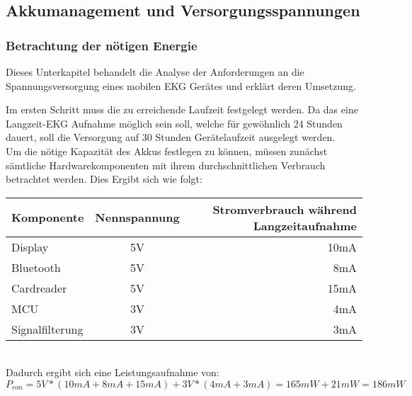 


\subsection{Akkumanagement und Versorgungsspannungen}


\subsubsection{Betrachtung der nötigen Energie}

Dieses Unterkapitel behandelt die Analyse der Anforderungen an die Spannungsversorgung eines mobilen EKG Gerätes und erklärt deren Umsetzung.

Im ersten Schritt muss die zu erreichende Laufzeit festgelegt werden. Da das eine Langzeit-EKG Aufnahme möglich sein soll, welche für gewöhnlich 24 Stunden dauert, soll die Versorgung auf 30 Stunden Gerätelaufzeit ausgelegt werden. \\

Um die nötige Kapazität des Akkus festlegen zu können, müssen zunächst sämtliche Hardwarekomponenten mit ihrem durchschnittlichen Verbrauch betrachtet werden. Dies Ergibt sich wie folgt:
\\

\begin{tabular}[h]{l|c|r}
Komponente & Nennspannung & Stromverbrauch während Langzeitaufnahme\\
\hline
Display & 5V & 10mA \\
Bluetooth & 5V & 8mA \\
Cardreader & 5V & 15mA \\
MCU & 3V & 4mA \\
Signalfilterung & 3V & 3mA \\
\end{tabular}
\\
Dadurch ergibt sich eine Leistungsaufnahme von:\\
$ P_{con} = 5V * (10mA + 8mA + 15mA) + 3V * (4mA + 3mA) = 165mW + 21mW = 186mW $

